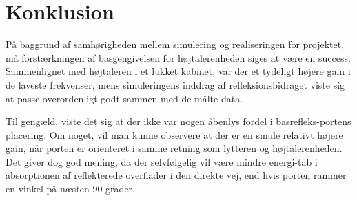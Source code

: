 \chapter{Konklusion}

På baggrund af samhørigheden mellem simulering og realiseringen for projektet, må forstærkningen af basgengivelsen for højtalerenheden siges at være en success. 
Sammenlignet med højtaleren i et lukket kabinet, var der et tydeligt højere gain i de laveste frekvenser, mens simuleringens inddrag af refleksionsbidraget viste sig at passe overordenligt godt sammen med de målte data. 

Til gengæld, viste det sig at der ikke var nogen åbenlys fordel i basrefleks-portens placering. Om noget, vil man kunne observere at der er en smule relativt højere gain, når porten er orienteret i samme retning som lytteren og højtalerenheden.
Det giver dog god mening, da der selvfølgelig vil være mindre energi-tab i absorptionen af reflekterede overflader i den direkte vej, end hvis porten rammer en vinkel på næsten 90 grader. 

